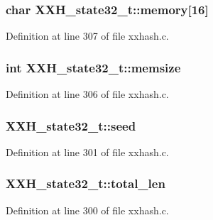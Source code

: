\subsubsection[{memory}]{\setlength{\rightskip}{0pt plus 5cm}char X\+X\+H\+\_\+state32\+\_\+t\+::memory\mbox{[}16\mbox{]}}\label{struct_x_x_h__state32__t_ade592624e217dcdd46f37634992c2f98}


Definition at line 307 of file xxhash.\+c.

\hypertarget{struct_x_x_h__state32__t_a7d511c88afd3fc22cbdff9153af8424d}{}
\subsubsection[{memsize}]{\setlength{\rightskip}{0pt plus 5cm}int X\+X\+H\+\_\+state32\+\_\+t\+::memsize}\label{struct_x_x_h__state32__t_a7d511c88afd3fc22cbdff9153af8424d}


Definition at line 306 of file xxhash.\+c.

\hypertarget{struct_x_x_h__state32__t_aa198d97d2ccb2e940e58c5676dd07b9f}{}
\subsubsection[{seed}]{ X\+X\+H\+\_\+state32\+\_\+t\+::seed}\label{struct_x_x_h__state32__t_aa198d97d2ccb2e940e58c5676dd07b9f}


Definition at line 301 of file xxhash.\+c.

\hypertarget{struct_x_x_h__state32__t_a968184eb96ed6c2c47e77d0e7b2562e2}{}
\subsubsection[{total\+\_\+len}]{ X\+X\+H\+\_\+state32\+\_\+t\+::total\+\_\+len}\label{struct_x_x_h__state32__t_a968184eb96ed6c2c47e77d0e7b2562e2}


Definition at line 300 of file xxhash.\+c.

